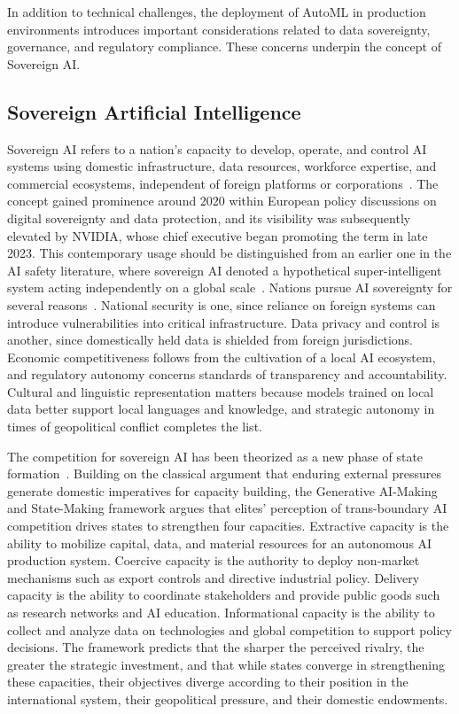 \documentclass[
english,                 %
bibtex,                  %
]{kththesis}
\numberwithin{listing}{chapter}
\begin{document}
In addition to technical challenges, the deployment of \gls{AutoML} in production environments introduces important considerations related to data sovereignty, governance, and regulatory compliance. These concerns underpin the concept of Sovereign \gls{AI}.

\subsection{Sovereign Artificial Intelligence}
\label{sec:bg_sovereign_artificial_intelligence}
\glsresetall

Sovereign \gls{AI} refers to a nation's capacity to develop, operate, and control \gls{AI} systems using domestic infrastructure, data resources, workforce expertise, and commercial ecosystems, independent of foreign platforms or corporations~\cite{dale_sovereign_2025}. The concept gained prominence around 2020 within European policy discussions on digital sovereignty and data protection, and its visibility was subsequently elevated by NVIDIA, whose chief executive began promoting the term in late 2023. This contemporary usage should be distinguished from an earlier one in the \gls{AI} safety literature, where sovereign \gls{AI} denoted a hypothetical super-intelligent system acting independently on a global scale~\cite{turchin_global_2019}. Nations pursue \gls{AI} sovereignty for several reasons~\cite{dale_sovereign_2025}. National security is one, since reliance on foreign systems can introduce vulnerabilities into critical infrastructure. Data privacy and control is another, since domestically held data is shielded from foreign jurisdictions. Economic competitiveness follows from the cultivation of a local \gls{AI} ecosystem, and regulatory autonomy concerns standards of transparency and accountability. Cultural and linguistic representation matters because models trained on local data better support local languages and knowledge, and strategic autonomy in times of geopolitical conflict completes the list.

The competition for sovereign \gls{AI} has been theorized as a new phase of state formation~\cite{wang_generative_2025}. Building on the classical argument that enduring external pressures generate domestic imperatives for capacity building, the Generative \gls{AI}-Making and State-Making framework argues that elites' perception of trans-boundary \gls{AI} competition drives states to strengthen four capacities. Extractive capacity is the ability to mobilize capital, data, and material resources for an autonomous \gls{AI} production system. Coercive capacity is the authority to deploy non-market mechanisms such as export controls and directive industrial policy. Delivery capacity is the ability to coordinate stakeholders and provide public goods such as research networks and \gls{AI} education. Informational capacity is the ability to collect and analyze data on technologies and global competition to support policy decisions. The framework predicts that the sharper the perceived rivalry, the greater the strategic investment, and that while states converge in strengthening these capacities, their objectives diverge according to their position in the international system, their geopolitical pressure, and their domestic endowments.
\end{document}
